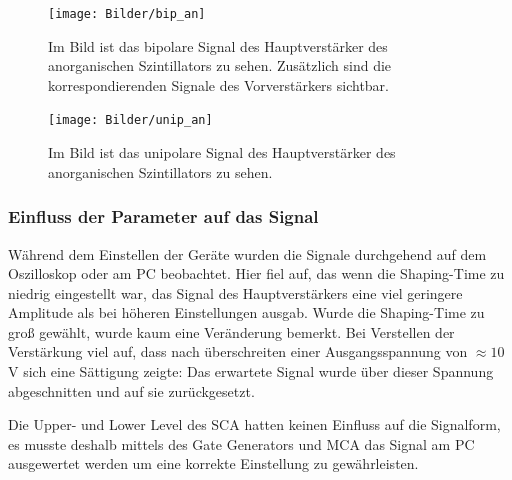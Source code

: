 \begin{figure}[h]
	\centering
	\texttt{[image: Bilder/bip\_an]}
	\caption[Bipolares Signal des Anorganischen Amp.]{\small Im Bild ist das bipolare Signal des Hauptverstärker des anorganischen Szintillators zu sehen. Zusätzlich sind die korrespondierenden Signale des Vorverstärkers sichtbar.}
	\label{an_bi}
\end{figure}

\begin{figure}[h]
	\centering
	\texttt{[image: Bilder/unip\_an]}
	\caption[Unipolares Signal des Anorganischen Amp.]{\small Im Bild ist das unipolare Signal des Hauptverstärker des anorganischen Szintillators zu sehen. }
	\label{an_uni}
\end{figure}
\subsubsection{Einfluss der Parameter auf das Signal}
Während dem Einstellen der Geräte wurden die Signale durchgehend auf dem Oszilloskop oder am PC beobachtet. Hier fiel auf, das wenn die Shaping-Time zu niedrig eingestellt war, das Signal des Hauptverstärkers eine viel geringere Amplitude als bei höheren Einstellungen ausgab. Wurde die Shaping-Time zu groß gewählt, wurde kaum eine Veränderung bemerkt. Bei Verstellen der Verstärkung viel auf, dass nach überschreiten einer Ausgangsspannung von $\approx 10\,$V sich eine Sättigung zeigte: Das erwartete Signal wurde über dieser Spannung abgeschnitten und auf sie zurückgesetzt.\par
Die Upper- und Lower Level des SCA hatten keinen Einfluss auf die Signalform, es musste deshalb mittels des Gate Generators und MCA das Signal am PC ausgewertet werden um eine korrekte Einstellung zu gewährleisten. 
